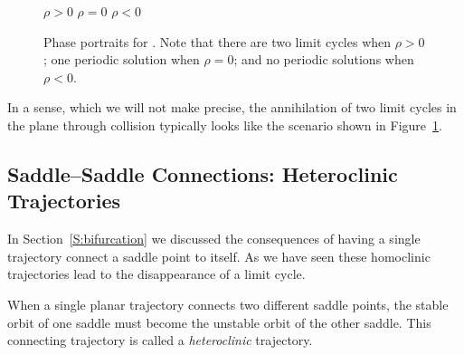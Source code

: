 \documentclass{ximera}
\begin{document}
\begin{figure}[htb]
           \centerline{%
	   }
 	\vspace*{-0.2in}
	\hspace{0.3in} $\rho>0$  \hspace{1.9in} $\rho=0$
		\hspace{1.9in} $\rho<0$ 
           \caption{Phase portraits for \protect{}. 
Note that there are two limit cycles when $\rho>0$; one periodic solution 
when  $\rho=0$; and no periodic solutions when $\rho<0$.}
           \label{F:papp}
\end{figure}

In a sense, which we will not make precise, the annihilation of two
limit cycles in the plane through collision typically looks like the 
scenario shown in Figure~\ref{F:papp}.  



\subsection*{Saddle--Saddle Connections: Heteroclinic Trajectories}

In Section~\ref{S:bifurcation} we discussed the consequences of having a 
single trajectory connect a saddle point to itself.  As we have seen these 
homoclinic trajectories lead to the disappearance of a limit cycle.

When a single planar trajectory connects two different saddle points, the 
stable orbit of one saddle must become the unstable orbit of the other 
saddle.  This connecting trajectory is called a {\em heteroclinic\/} 
trajectory.
\end{document}
